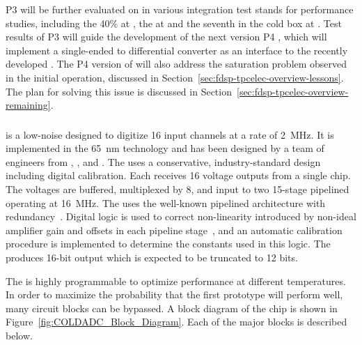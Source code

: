 P3   will be further evaluated on  
in various integration test stands for performance studies, including 
the \num{40}\%  at , the   
at  and the seventh   
in the cold box at . Test results of P3   
will guide the development of the next version P4  , 
which will implement a single-ended to differential converter as an 
interface to the recently developed .  The P4 version of 
 will also address the saturation problem observed in
the  initial operation, discussed in 
Section~\ref{sec:fdsp-tpcelec-overview-lessons}. The plan for solving
this issue is discussed %
in Section~\ref{sec:fdsp-tpcelec-overview-remaining}.

\subsubsection{ }
\label{sec:fdsp-tpcelec-design-femb-adc}

 is a low-noise   designed to digitize
\num{16} input channels at a rate of \SI{2}{MHz}. It is implemented in the 
\SI{65}{nm}  technology and has been designed by a team of engineers
from , , and .  The  uses a conservative,
industry-standard design including digital calibration.  Each 
receives \num{16} voltage outputs from a single  chip.  The voltages
are buffered, multiplexed by \num{8}, and input to two \num{15}-stage pipelined 
operating at \SI{16}{MHz}.  The  uses the well-known pipelined architecture
with redundancy~\cite{PipelinedADC}.  Digital logic is used to correct non-linearity
introduced by non-ideal amplifier gain and offsets in each pipeline
stage~\cite{CalibrationCorrection}, and an automatic calibration procedure is
implemented to determine the constants used in this logic.  The  produces
\num{16}-bit output which is expected to be truncated to \num{12} bits.

The  is highly programmable to optimize performance at different
temperatures.  In order to maximize the probability that the first prototype
 will perform well, many circuit blocks can be bypassed. A block
diagram of the chip is shown in Figure~\ref{fig:COLDADC_Block_Diagram}. Each of
the major blocks is described below.

